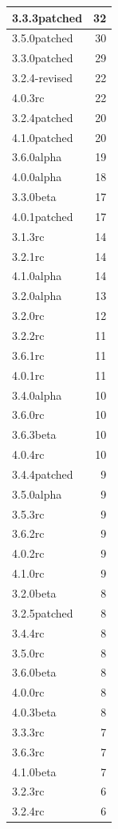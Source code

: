 \documentclass[
]{book}
\begin{document}
\begin{table}
\begin{tabular}[t]{l|r}
\hline
3.3.3patched & 32\\
\hline
3.5.0patched & 30\\
\hline
3.3.0patched & 29\\
\hline
3.2.4-revised & 22\\
\hline
4.0.3rc & 22\\
\hline
3.2.4patched & 20\\
\hline
4.1.0patched & 20\\
\hline
3.6.0alpha & 19\\
\hline
4.0.0alpha & 18\\
\hline
3.3.0beta & 17\\
\hline
4.0.1patched & 17\\
\hline
3.1.3rc & 14\\
\hline
3.2.1rc & 14\\
\hline
4.1.0alpha & 14\\
\hline
3.2.0alpha & 13\\
\hline
3.2.0rc & 12\\
\hline
3.2.2rc & 11\\
\hline
3.6.1rc & 11\\
\hline
4.0.1rc & 11\\
\hline
3.4.0alpha & 10\\
\hline
3.6.0rc & 10\\
\hline
3.6.3beta & 10\\
\hline
4.0.4rc & 10\\
\hline
3.4.4patched & 9\\
\hline
3.5.0alpha & 9\\
\hline
3.5.3rc & 9\\
\hline
3.6.2rc & 9\\
\hline
4.0.2rc & 9\\
\hline
4.1.0rc & 9\\
\hline
3.2.0beta & 8\\
\hline
3.2.5patched & 8\\
\hline
3.4.4rc & 8\\
\hline
3.5.0rc & 8\\
\hline
3.6.0beta & 8\\
\hline
4.0.0rc & 8\\
\hline
4.0.3beta & 8\\
\hline
3.3.3rc & 7\\
\hline
3.6.3rc & 7\\
\hline
4.1.0beta & 7\\
\hline
3.2.3rc & 6\\
\hline
3.2.4rc & 6\\

\end{tabular}
\end{table}
\end{document}
